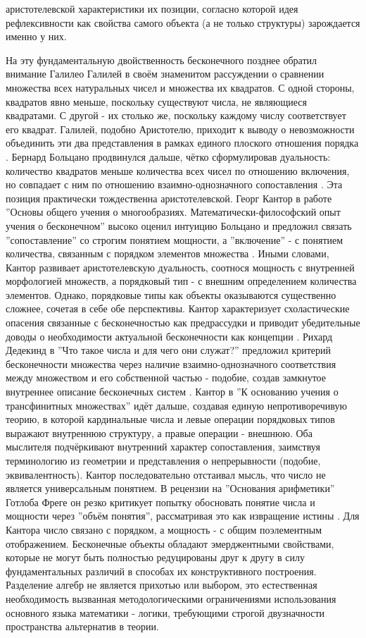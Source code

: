 \documentclass[12pt]{article}
\begin{document}
аристотелевской характеристики их позиции, согласно которой идея рефлексивности как свойства самого объекта (а не только структуры) зарождается именно у них.

На эту фундаментальную двойственность бесконечного позднее обратил внимание Галилео Галилей в своём знаменитом рассуждении о сравнении множества всех натуральных чисел и множества их квадратов. С одной стороны, квадратов явно меньше, поскольку существуют числа, не являющиеся квадратами. С другой - их столько же, поскольку каждому числу соответствует его квадрат. Галилей, подобно Аристотелю, приходит к выводу о невозможности объединить эти два представления в рамках единого плоского отношения порядка  \cite{galilei-squares}. Бернард Больцано продвинулся дальше, чётко сформулировав дуальность: количество квадратов меньше количества всех чисел по отношению включения, но совпадает с ним по отношению взаимно-однозначного сопоставления \cite{bolzano-duality}. Эта позиция практически тождественна аристотелевской. Георг Кантор в работе ''Основы общего учения о многообразиях. Математически-философский опыт учения о бесконечном'' высоко оценил интуицию Больцано и предложил связать ''сопоставление'' со строгим понятием мощности, а ''включение'' - с понятием количества, связанным с порядком элементов множества \cite{cantor-bolzano}. Иными словами, Кантор развивает аристотелевскую дуальность, соотнося мощность с внутренней морфологией множеств, а порядковый тип - с внешним определением количества элементов. Однако, порядковые типы как объекты оказываются существенно сложнее, сочетая в себе обе перспективы. Кантор характеризует схоластические опасения связанные с бесконечностью как предрассудки и приводит убедительные доводы о необходимости актуальной бесконечности как концепции \cite{cantor-actual-infinity}. Рихард Дедекинд в ''Что такое числа и для чего они служат?'' предложил критерий бесконечности множества через наличие взаимно-однозначного соответствия между множеством и его собственной частью - подобие, создав замкнутое внутреннее описание бесконечных систем \cite{dedekind-infinity}. Кантор в ''К основанию учения о трансфинитных множествах'' идёт дальше, создавая единую непротиворечивую теорию, в которой кардинальные числа и левые операции порядковых типов выражают внутреннюю структуру, а правые операции - внешнюю. Оба мыслителя подчёркивают внутренний характер сопоставления, заимствуя терминологию из геометрии и представления о непрерывности (подобие, эквивалентность). Кантор последовательно отстаивал мысль, что число не является универсальным понятием. В рецензии на ''Основания арифметики'' Готлоба Фреге он резко критикует попытку обосновать понятие числа и мощности через ''объём понятия'', рассматривая это как извращение истины \cite{cantor-frege}. Для Кантора число связано с порядком, а мощность - с общим поэлементным отображением. Бесконечные объекты обладают эмерджентными свойствами, которые не могут быть полностью редуцированы друг к другу в силу фундаментальных различий в способах их конструктивного построения. Разделение алгебр не является прихотью или выбором, это естественная необходимость вызванная методологическими ограничениями использования основного языка математики - логики, требующими строгой двузначности пространства альтернатив в теории. 
\end{document}
